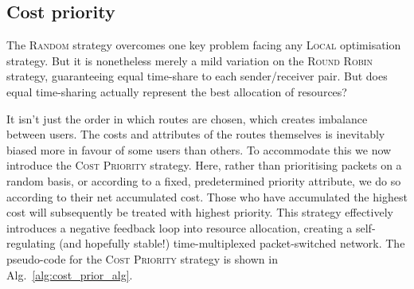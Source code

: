 \documentclass[aps,rmp,twocolumn,amsmath,amssymb,nofootinbib,superscriptaddress,longbibliography,floatfix,table-of-contents,eqsecnum]{revtex4-1}
\begin{document}
%
%

\subsection{Cost priority} \label{sec:cost_priority} 

The \textsc{Random} strategy overcomes one key problem facing any \textsc{Local} optimisation strategy. But it is nonetheless merely a mild variation on the \textsc{Round Robin} strategy, guaranteeing equal time-share to each sender/receiver pair. But does equal time-sharing actually represent the best allocation of resources?

It isn't just the order in which routes are chosen, which creates imbalance between users. The costs and attributes of the routes themselves is inevitably biased more in favour of some users than others. To accommodate this we now introduce the \textsc{Cost Priority} strategy. Here, rather than prioritising packets on a random basis, or according to a fixed, predetermined priority attribute, we do so according to their net accumulated cost. Those who have accumulated the highest cost will subsequently be treated with highest priority. This strategy effectively introduces a negative feedback loop into resource allocation, creating a self-regulating (and hopefully stable!) time-multiplexed packet-switched network. The pseudo-code for the \textsc{Cost Priority} strategy is shown in Alg.~\ref{alg:cost_prior_alg}.
\end{document}
